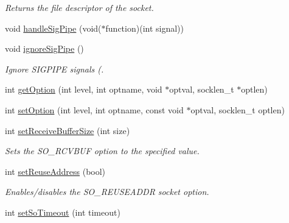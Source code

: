 \begin{DoxyCompactItemize}
\begin{DoxyCompactList}\small\item\em Returns the file descriptor of the socket. \end{DoxyCompactList}\item 
void \hyperlink{class_server_socket_afe81d7c30d1e963e6a043b868560dbbd}{handle\-Sig\-Pipe} (void($\ast$function)(int signal))
\item 
void \hyperlink{class_server_socket_ac159a12414df54dfef149a8de6aacb20}{ignore\-Sig\-Pipe} ()
\begin{DoxyCompactList}\small\item\em Ignore S\-I\-G\-P\-I\-P\-E signals (. \end{DoxyCompactList}\item 
int \hyperlink{class_server_socket_a7ad8a5581c52046e641b32d96eb23406}{get\-Option} (int level, int optname, void $\ast$optval, socklen\-\_\-t $\ast$optlen)
\item 
int \hyperlink{class_server_socket_ad69fa5c5891f028192a291044b9191e2}{set\-Option} (int level, int optname, const void $\ast$optval, socklen\-\_\-t optlen)
\item 
\hypertarget{class_server_socket_ab34154bc6114c638ae02f5e018121099}{int \hyperlink{class_server_socket_ab34154bc6114c638ae02f5e018121099}{set\-Receive\-Buffer\-Size} (int size)}\label{class_server_socket_ab34154bc6114c638ae02f5e018121099}

\begin{DoxyCompactList}\small\item\em Sets the S\-O\-\_\-\-R\-C\-V\-B\-U\-F option to the specified value. \end{DoxyCompactList}\item 
\hypertarget{class_server_socket_ae60d7cc31ad535e5d3cac42e38b8ec98}{int \hyperlink{class_server_socket_ae60d7cc31ad535e5d3cac42e38b8ec98}{set\-Reuse\-Address} (bool)}\label{class_server_socket_ae60d7cc31ad535e5d3cac42e38b8ec98}

\begin{DoxyCompactList}\small\item\em Enables/disables the S\-O\-\_\-\-R\-E\-U\-S\-E\-A\-D\-D\-R socket option. \end{DoxyCompactList}\item 
\hypertarget{class_server_socket_aedb9144c9c375fcb14ac47bcb9d2eb17}{int \hyperlink{class_server_socket_aedb9144c9c375fcb14ac47bcb9d2eb17}{set\-So\-Timeout} (int timeout)}\label{class_server_socket_aedb9144c9c375fcb14ac47bcb9d2eb17}


\end{DoxyCompactItemize}

